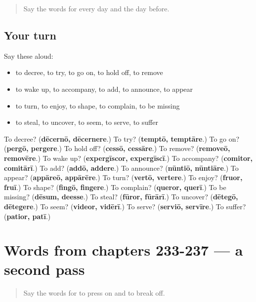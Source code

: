 \label{lesson:LA-R237-first-pass-words-from-chapters-229-232}



\begin{quote}
Say the words for every day and the day before.
\end{quote}

\subsection*{Your turn}
Say these aloud:

\begin{itemize}
\raggedright
  \item to decree, to try, to go on, to hold off, to remove
  \item to wake up, to accompany, to add, to announce, to appear
  \item to turn, to enjoy, to shape, to complain, to be missing
  \item to steal, to uncover, to seem, to serve, to suffer
\end{itemize}

\begin{tcolorbox}[breakable,colback=teal!4,colframe=teal!35!black,title={Before you move on}]
To decree? (\textbf{dēcernō, dēcernere}.) To try? (\textbf{temptō, temptāre}.) To go on? (\textbf{pergō, pergere}.) To hold off? (\textbf{cessō, cessāre}.) To remove? (\textbf{removeō, removēre}.) To wake up? (\textbf{expergīscor, expergīscī}.) To accompany? (\textbf{comitor, comitārī}.) To add? (\textbf{addō, addere}.) To announce? (\textbf{nūntiō, nūntiāre}.) To appear? (\textbf{appāreō, appārēre}.) To turn? (\textbf{vertō, vertere}.) To enjoy? (\textbf{fruor, fruī}.) To shape? (\textbf{fingō, fingere}.) To complain? (\textbf{queror, querī}.) To be missing? (\textbf{dēsum, deesse}.) To steal? (\textbf{fūror, fūrārī}.) To uncover? (\textbf{dētegō, dētegere}.) To seem? (\textbf{videor, vidērī}.) To serve? (\textbf{serviō, servīre}.) To suffer? (\textbf{patior, patī}.)
\end{tcolorbox}
\section[(dialogue)]{Words from chapters 233-237 — a second pass}

\label{lesson:LA-R237-second-pass-words-from-chapters-233-237}



\begin{quote}
Say the words for to press on and to break off.
\end{quote}

